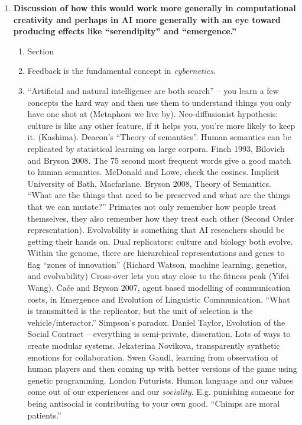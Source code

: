 \begin{enumerate}[start=4]
\item \textbf{Discussion of how this would work more generally in
  computational creativity and perhaps in AI more generally with an
  eye toward producing effects like ``serendipity'' and
  ``emergence.''}
\begin{enumerate}
\item Section \item Feedback is the fundamental concept in \emph{cybernetics}.  
\item ``Artificial and natural intelligence are both search'' -- you learn a few concepts the hard way and then use them to understand things you only have one shot at (Metaphors we live by).  Neo-diffusionist hypothesis: culture is like any other feature, if it helps you, you're more likely to keep it.  (Kashima).  Deacon's ``Theory of semantics''.  Human semantics can be replicated by statistical learning on large corpora.  Finch 1993, Bilovich and Bryson 2008.  The 75 second most frequent words give a good match to human semantics.  McDonald and Lowe, check the cosines.  Implicit University of Bath, Macfarlane.  Bryson 2008, Theory of Semantics.  ``What are the things that need to be preserved and what are the things that we can mutate?''  Primates not only remember how people treat themselves, they also remember how they treat each other (Second Order representation).  Evolvability is something that AI reseachers should be getting their hands on.  Dual replicators: culture and biology both evolve.  Within the genome, there are hierarchical representations and genes to flag ``zones of innovation'' (Richard Watson, machine learning, genetics, and evolvability)  Cross-over lets you stay close to the fitness peak (Yifei Wang).  \v{C}a\v{c}e and Bryson 2007, agent based modelling of communication costs, in Emergence and Evolution of Linguistic Communication.  ``What is transmitted is the replicator, but the unit of selection is the vehicle/interactor.''  Simpson's paradox.  Daniel Taylor, Evolution of the Social Contract -- everything is semi-private, disseration.  Lots of ways to create modular systems.  Jekaterina Novikova, transparently synthetic emotions for collaboration.  Swen Gaudl, learning from observation of human players and then coming up with better versions of the game using genetic programming.  London Futurists.  Human language and our values come out of our experiences and our \emph{sociality}.  E.g. punishing someone for being antisocial is contributing to your own good.  ``Chimps are moral patients.''

\end{enumerate}
\end{enumerate}
